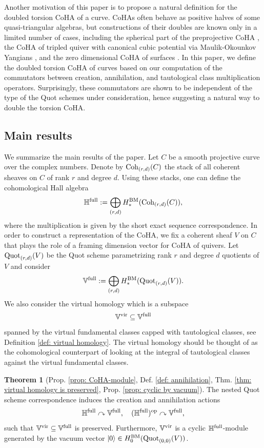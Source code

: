 \documentclass[10pt]{amsart}
\newcommand{\BH}{\mathbb{H}}
\newcommand{\BV}{\mathbb{V}}
\newcommand{\Quot}{\textnormal{Quot}}
\newcommand{\Coh}{\textnormal{Coh}}
\newcommand{\BM}{\textnormal{BM}}
\newcommand{\op}{\textnormal{op}}
\newcommand{\+}{{}^+}
\newcommand{\full}{\textnormal{full}}
\newcommand{\vir}{\textnormal{vir}}
\theoremstyle{definition}
\theoremstyle {definition}
\theoremstyle {definition}
\newtheorem{introtheorem}{Theorem}
\begin{document}
Another motivation of this paper is to propose a natural definition for the doubled torsion CoHA of a curve. CoHAs often behave as positive halves of some quasi-triangular algebras, but constructions of their doubles are known only in a limited number of cases, including the spherical part of the preprojective CoHA \cite{YZ}, the CoHA of tripled quiver with canonical cubic potential via Maulik-Okounkov Yangians \cite{MaulikOkounkov, BD, SV_Yangian}, and the zero dimensional CoHA of surfaces \cite{MMSV}. In this paper, we define the doubled torsion CoHA of curves based on our computation of the commutators between creation, annihilation, and tautological class multiplication operators. Surprisingly, these commutators are shown to be independent of the type of the Quot schemes under consideration, hence suggesting a natural way to double the torsion CoHA. 



\subsection{Main results}


We summarize the main results of the paper. Let $C$ be a smooth projective curve over the complex numbers. Denote by $\Coh_{(r,d)}(C)$ the stack of all coherent sheaves on $C$ of rank $r$ and degree $d$. Using these stacks, one can define the cohomological Hall algebra
$$\BH^\full:=\bigoplus_{(r,d)}H^\BM_*(\Coh_{(r,d)}(C)),
$$
where the multiplication is given by the short exact sequence correspondence. In order to construct a representation of the CoHA, we fix a coherent sheaf $V$ on $C$ that plays the role of a framing dimension vector for CoHA of quivers. Let $\Quot_{(r,d)}(V)$ be the Quot scheme parametrizing rank $r$ and degree $d$ quotients of $V$ and consider 
$$\BV^\full:=\bigoplus_{(r,d)}H^\BM_*(\Quot_{(r,d)}(V)). 
$$
We also consider the virtual homology which is a subspace $$\BV^\vir\subseteq \BV^\full$$ 
spanned by the virtual fundamental classes capped with tautological classes, see Definition \ref{def: virtual homology}. The virtual homology should be thought of as the cohomological counterpart of looking at the integral of tautological classes against the virtual fundamental classes.

\begin{introtheorem}[Prop. \ref{prop: CoHA-module}, Def. \ref{def: annihilation}, Thm. \ref{thm: virtual homology is preserved}, Prop. \ref{prop: cyclic by vacuum}]
    The nested Quot scheme correspondence induces the creation and annihilation actions
    $$\BH^\full \curvearrowright \BV^\full,\quad (\BH^\full)^\op \curvearrowright \BV^\full,
    $$
    such that $\BV^\vir\subseteq \BV^\full$ is preserved. Furthermore, $\BV^\vir$ is a cyclic $\BH^\full$-module generated by the vacuum vector $|0\rangle\in H^\BM_0(\Quot_{(0,0)}(V))$. 

\end{introtheorem}
\end{document}
